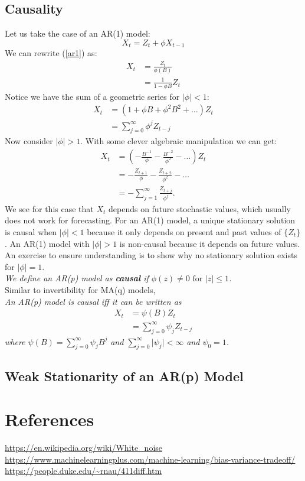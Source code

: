 \documentclass{article}
\begin{document}
\subsection{Causality}
Let us take the case of an AR(1) model:
\begin{equation}\label{ar1}
    X_t = Z_t + \phi X_{t-1}\nonumber
\end{equation}
We can rewrite (\ref{ar1}) as:
\begin{align}\label{ar1 soln}
    X_t &= \frac{Z_t}{\phi(B)}\nonumber\\
    &= \frac{1}{1-\phi B} Z_t
\end{align}
Notice we have the sum of a geometric series for $\lvert \phi \rvert < 1$:
\begin{align}
    X_t &= (1 + \phi B + \phi^2 B^2 + \ldots)Z_t\nonumber\\
    &= \sum_{j=0}^{\infty} \phi^j Z_{t-j}
\end{align}
Now consider $\lvert \phi \rvert > 1$. With some clever algebraic manipulation we can get:
\begin{align}\label{ar greater 1}
    X_t &= (-\frac{B^{-1}}{\phi}-\frac{B^{-2}}{\phi^2}-\ldots)Z_t\nonumber\\
    &= -\frac{Z_{t+1}}{\phi} -\frac{Z_{t+2}}{\phi^2}-\ldots\nonumber\\
    &= - \sum_{j=1}^{\infty}\frac{Z_{t+j}}{\phi^j}.
\end{align}
We see for this case that $X_t$ depends on future stochastic values, which usually does not work for forecasting. For an AR(1) model, a unique stationary solution is causal when $\lvert \phi \rvert < 1$ because it only depends on present and past values of $\{Z_t\}$. An AR(1) model with $\lvert \phi \rvert > 1$ is non-causal because it depends on future values. An exercise to ensure understanding is to show why no stationary solution exists for $\lvert \phi \rvert=1$.\\
\textit{We define an AR(p) model as \textbf{causal} if $\phi(z)\neq 0 \text{ for } \lvert z \rvert \leq 1$.}\\
Similar to invertibility for MA(q) models,\\
\textit{An AR(p) model is causal iff it can be written as
\begin{align}\label{causal}
    X_t &=\psi(B)Z_t\nonumber\\
    &= \sum_{j=0}^{\infty}\psi_j Z_{t-j}
\end{align}
where $\psi(B)=\sum_{j=0}^{\infty}\psi_j B^j$ and $\sum_{j=0}^{\infty}\lvert \psi_j \rvert < \infty$ and $\psi_0=1$.}

\subsection{Weak Stationarity of an AR(p) Model}


\section{References}
\url{https://en.wikipedia.org/wiki/White\_noise}\\
\url{https://www.machinelearningplus.com/machine-learning/bias-variance-tradeoff/}\\
\url{https://people.duke.edu/~rnau/411diff.htm}
\end{document}
